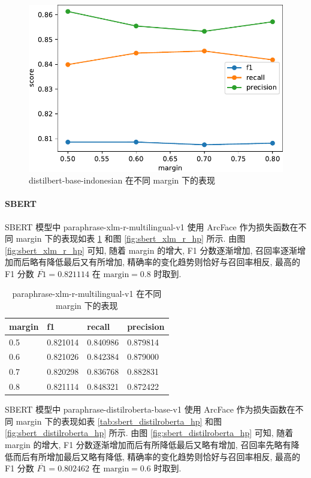 \documentclass[12pt]{article}
\begin{document}
\begin{figure}[htbp]
  \centering
  \includegraphics[width=12cm]{distilbert_hp.pdf}
  \caption{distilbert-base-indonesian 在不同 margin 下的表现}
  \label{fig:distilbert_hp}
\end{figure}

\paragraph{SBERT}

SBERT 模型中 paraphrase-xlm-r-multilingual-v1 使用 ArcFace 作为损失函数在不同 margin 下的表现如表 \ref{tab:sbert_xlm_r_hp} 和图 \ref{fig:sbert_xlm_r_hp} 所示. 由图 \ref{fig:sbert_xlm_r_hp} 可知, 随着 margin 的增大, F1 分数逐渐增加, 召回率逐渐增加而后略有降低最后又有所增加, 精确率的变化趋势则恰好与召回率相反, 最高的 F1 分数 $\overline{F1}=0.821114$ 在 $\text{margin} = 0.8$ 时取到.

\begin{table}[htbp]
  \centering
  \caption{paraphrase-xlm-r-multilingual-v1 在不同 margin 下的表现}
  \label{tab:sbert_xlm_r_hp}
  \begin{tabular}{llll}
    \toprule
    margin & f1       & recall   & precision \\
    \midrule
    0.5 & 0.821014 & 0.840986 & 0.879814  \\
    0.6 & 0.821026 & 0.842384 & 0.879000  \\
    0.7 & 0.820298 & 0.836768 & 0.882831  \\
    0.8 & 0.821114 & 0.848321 & 0.872422  \\
    \bottomrule
  \end{tabular}
\end{table}

SBERT 模型中 paraphrase-distilroberta-base-v1 使用 ArcFace 作为损失函数在不同 margin 下的表现如表 \ref{tab:sbert_distilroberta_hp} 和图 \ref{fig:sbert_distilroberta_hp} 所示. 由图 \ref{fig:sbert_distilroberta_hp} 可知, 随着 margin 的增大, F1 分数逐渐增加而后有所降低最后又略有增加, 召回率先略有降低而后有所增加最后又略有降低, 精确率的变化趋势则恰好与召回率相反, 最高的 F1 分数 $\overline{F1}=0.802462$ 在 $\text{margin} = 0.6$ 时取到.
\end{document}
